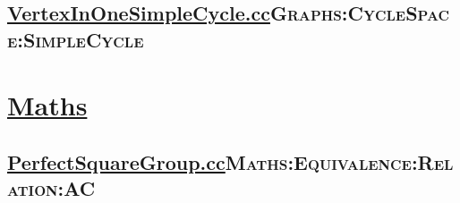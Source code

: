 \documentclass[11pt]{article}
\begin{document}
\subsection{\href{./Graphs/VertexInOneSimpleCycle.cc}{VertexInOneSimpleCycle.cc}\hfill{}\textsc{Graphs:CycleSpace:SimpleCycle}}
\label{sec:org6b8e169}

\section{\href{./Maths/}{Maths}}
\label{sec:org9df0119}
\subsection{\href{./Maths/PerfectSquareGroup.cc}{PerfectSquareGroup.cc}\hfill{}\textsc{Maths:Equivalence:Relation:AC}}
\label{sec:org5b89fbe}
\end{document}
